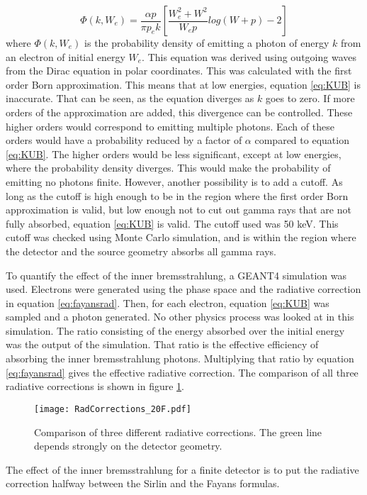 \documentclass[../MaxHughesThesis.tex]{subfiles}
\begin{document}
\begin{equation}
	\Phi(k,W_{e}) = \frac{ \alpha p}{ \pi p_{e} k} [\frac{W_{e}^{2} + W^{2}}{W_{e}p}log(W + p) - 2]
	\label{eq:KUB}
\end{equation}
where $\Phi(k,W_{e})$ is the probability density of emitting a photon of energy $k$ from an electron of initial energy $W_{e}$.
This equation was derived using outgoing waves from the Dirac equation in polar coordinates.
This was calculated with the first order Born approximation.
This means that at low energies, equation \ref{eq:KUB} is inaccurate. 
That can be seen, as the equation diverges as $k$ goes to zero.
If more orders of the approximation are added, this divergence can be controlled.
These higher orders would correspond to emitting multiple photons.
Each of these orders would have a probability reduced by a factor of $\alpha$ compared to equation \ref{eq:KUB}.
The higher orders would be less significant, except at low energies, where the probability density diverges.
This would make the probability of emitting no photons finite.	 		
However, another possibility is to add a cutoff. 
As long as the cutoff is high enough to be in the region where the first order Born approximation is valid, but low enough not to cut out gamma rays that are not fully absorbed, equation \ref{eq:KUB} is valid.
The cutoff used was 50 keV.
This cutoff was checked using Monte Carlo simulation, and is within the region where the detector and the source geometry absorbs all gamma rays.

To quantify the effect of the inner bremsstrahlung, a GEANT4 simulation was used.
Electrons were generated using the phase space and the radiative correction in equation \ref{eq:fayansrad}.
Then, for each electron, equation \ref{eq:KUB} was sampled and a photon generated.
No other physics process was looked at in this simulation.
The ratio consisting of the energy absorbed over the initial energy was the output of the simulation.
That ratio is the effective efficiency of absorbing the inner bremsstrahlung photons.
Multiplying that ratio by equation \ref{eq:fayansrad} gives the effective radiative correction.
The comparison of all three radiative corrections is shown in figure \ref{fig:rad}.

\begin{figure}[!htb]
	\centerline{\texttt{[image: RadCorrections\_20F.pdf]}}
	\caption{Comparison of three different radiative corrections.
		 The green line depends strongly on the detector geometry.
		 }
	\label{fig:rad}
\end{figure}
The effect of the inner bremsstrahlung for a finite detector is to put the radiative correction halfway between the Sirlin and the Fayans formulas.
\end{document}
